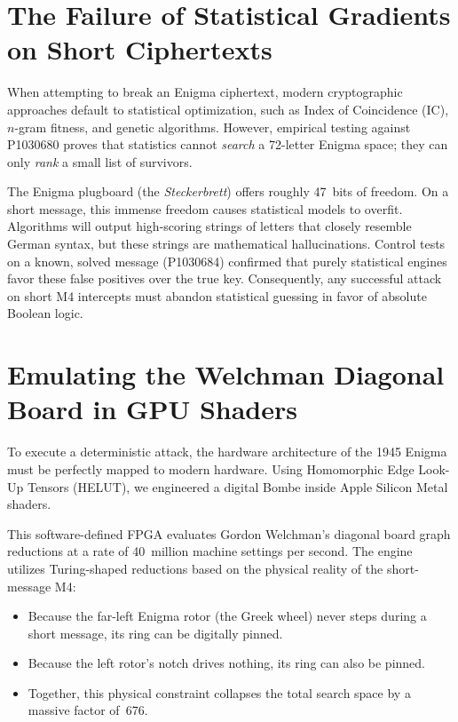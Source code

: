 \documentclass[11pt,a4paper]{article}
\begin{document}
\section{The Failure of Statistical Gradients on Short Ciphertexts}

When attempting to break an Enigma ciphertext, modern cryptographic
approaches default to statistical optimization, such as Index of
Coincidence (IC), $n$-gram fitness, and genetic algorithms.
However, empirical testing against P1030680 proves that statistics cannot
\emph{search} a 72-letter Enigma space; they can only \emph{rank} a small
list of survivors.

The Enigma plugboard (the \emph{Steckerbrett}) offers roughly 47~bits of
freedom.
On a short message, this immense freedom causes statistical models to
overfit.
Algorithms will output high-scoring strings of letters that closely
resemble German syntax, but these strings are mathematical hallucinations.
Control tests on a known, solved message (P1030684) confirmed that purely
statistical engines favor these false positives over the true key.
Consequently, any successful attack on short M4 intercepts must abandon
statistical guessing in favor of absolute Boolean logic.

\section{Emulating the Welchman Diagonal Board in GPU Shaders}

To execute a deterministic attack, the hardware architecture of the 1945
Enigma must be perfectly mapped to modern hardware.
Using Homomorphic Edge Look-Up Tensors (HELUT), we engineered a digital
Bombe inside Apple Silicon Metal shaders.

This software-defined FPGA evaluates Gordon Welchman's diagonal board
graph reductions at a rate of 40~million machine settings per second.
The engine utilizes Turing-shaped reductions based on the physical reality
of the short-message M4:
\begin{itemize}[leftmargin=*]
  \item Because the far-left Enigma rotor (the Greek wheel) never steps
        during a short message, its ring can be digitally pinned.
  \item Because the left rotor's notch drives nothing, its ring can also
        be pinned.
  \item Together, this physical constraint collapses the total search
        space by a massive factor of~676.
\end{itemize}
\end{document}
